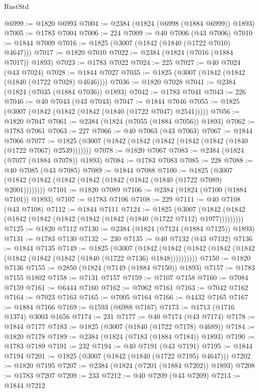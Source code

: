 \begin{lexlean}{RustStd}
\begin{coremodule}
@6999 := @1820 @6993
@7004 := @2384 (@1824 (@6998 (@1884 @6999)) @1893)
@7005 := @1783 @7004
@7006 := 224
@7009 := @40 @7006 (@43 @7006)
@7010 := @1844 @7009
@7016 := @1825 (@3007 (@1842 (@1840 (@1722 @7010) @4647)))
@7017 := @1820 @7010
@7022 := @2384 (@1824 (@7016 (@1884 @7017)) @1893)
@7023 := @1783 @7022
@7024 := 225
@7027 := @40 @7024 (@43 @7024)
@7028 := @1844 @7027
@7035 := @1825 (@3007 (@1842 (@1842 (@1840 (@1722 @7028) @4646))))
@7036 := @1820 @7028
@7041 := @2384 (@1824 (@7035 (@1884 @7036)) @1893)
@7042 := @1783 @7041
@7043 := 226
@7046 := @40 @7043 (@43 @7043)
@7047 := @1844 @7046
@7055 := @1825 (@3007 (@1842 (@1842 (@1842 (@1840 (@1722 @7047) @2541)))))
@7056 := @1820 @7047
@7061 := @2384 (@1824 (@7055 (@1884 @7056)) @1893)
@7062 := @1783 @7061
@7063 := 227
@7066 := @40 @7063 (@43 @7063)
@7067 := @1844 @7066
@7077 := @1825 (@3007 (@1842 (@1842 (@1842 (@1842 (@1842 (@1840 (@1722 @7067) @2539)))))))
@7078 := @1820 @7067
@7083 := @2384 (@1824 (@7077 (@1884 @7078)) @1893)
@7084 := @1783 @7083
@7085 := 228
@7088 := @40 @7085 (@43 @7085)
@7089 := @1844 @7088
@7100 := @1825 (@3007 (@1842 (@1842 (@1842 (@1842 (@1842 (@1842 (@1840 (@1722 @7089) @2001))))))))
@7101 := @1820 @7089
@7106 := @2384 (@1824 (@7100 (@1884 @7101)) @1893)
@7107 := @1783 @7106
@7108 := 229
@7111 := @40 @7108 (@43 @7108)
@7112 := @1844 @7111
@7124 := @1825
    (@3007 (@1842 (@1842 (@1842 (@1842 (@1842 (@1842 (@1842 (@1840 (@1722 @7112) @1977)))))))))
@7125 := @1820 @7112
@7130 := @2384 (@1824 (@7124 (@1884 @7125)) @1893)
@7131 := @1783 @7130
@7132 := 230
@7135 := @40 @7132 (@43 @7132)
@7136 := @1844 @7135
@7149 := @1825
    (@3007
      (@1842 (@1842 (@1842 (@1842 (@1842 (@1842 (@1842 (@1842 (@1840 (@1722 @7136) @1848))))))))))
@7150 := @1820 @7136
@7155 := @2850 (@1824 (@7149 (@1884 @7150)) @1893)
@7157 := @1783 @7155 @1802
@7158 := @7131 @7157
@7159 := @7107 @7158
@7160 := @7084 @7159
@7161 := @6444 @7160
@7162 := @7062 @7161
@7163 := @7042 @7162
@7164 := @7023 @7163
@7165 := @7005 @7164
@7166 := @4432 @7165
@7167 := @1884 @7166
@7169 := @1593 (@6988 @7167)
@7173 := @1713 (@1716 @1374) @3003 @1656
@7174 := 231
@7177 := @40 @7174 (@43 @7174)
@7178 := @1844 @7177
@7183 := @1825 (@3007 (@1840 (@1722 @7178) @4689))
@7184 := @1820 @7178
@7189 := @2384 (@1824 (@7183 (@1884 @7184)) @1893)
@7190 := @1783 @7189
@7191 := 232
@7194 := @40 @7191 (@43 @7191)
@7195 := @1844 @7194
@7201 := @1825 (@3007 (@1842 (@1840 (@1722 @7195) @4647)))
@7202 := @1820 @7195
@7207 := @2384 (@1824 (@7201 (@1884 @7202)) @1893)
@7208 := @1783 @7207
@7209 := 233
@7212 := @40 @7209 (@43 @7209)
@7213 := @1844 @7212

\end{coremodule}
\end{lexlean}

